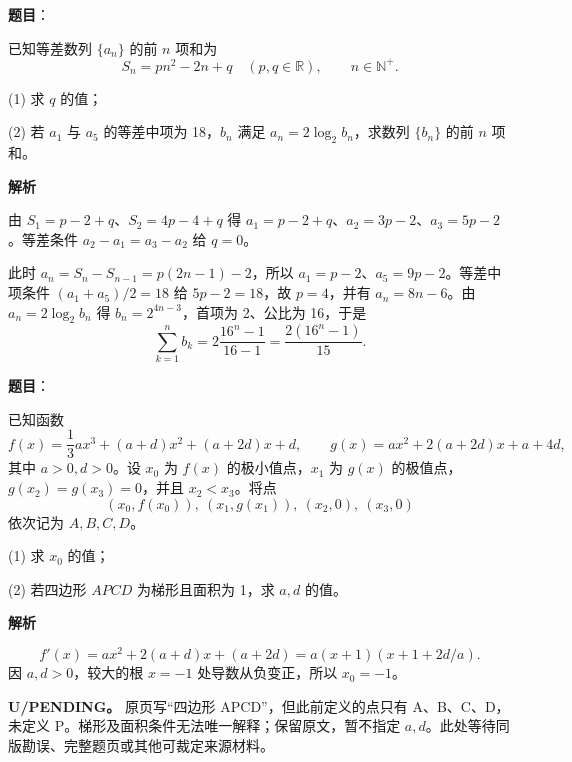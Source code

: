 \begin{answer}

\textbf{题目}：

已知等差数列 \(\{a_n\}\) 的前 \(n\) 项和为
\nopagebreak[4]
\[
S_n=pn^2-2n+q\quad(p,q\in\mathbb R),\qquad n\in\mathbb N^+.
\]

(1) 求 \(q\) 的值；

(2) 若 \(a_1\) 与 \(a_5\) 的等差中项为 18，\(b_n\) 满足 \(a_n=2\log_2b_n\)，求数列 \(\{b_n\}\) 的前 \(n\) 项和。

\textbf{解析}


由 $S_1=p-2+q$、$S_2=4p-4+q$ 得 $a_1=p-2+q$、$a_2=3p-2$、$a_3=5p-2$。等差条件 $a_2-a_1=a_3-a_2$ 给 $q=0$。


此时 $a_n=S_n-S_{n-1}=p(2n-1)-2$，所以 $a_1=p-2$、$a_5=9p-2$。等差中项条件 $(a_1+a_5)/2=18$ 给 $5p-2=18$，故 $p=4$，并有 $a_n=8n-6$。由 $a_n=2\log_2 b_n$ 得 $b_n=2^{4n-3}$，首项为 2、公比为 16，于是
\nopagebreak[4]
\[
\sum_{k=1}^{n}b_k=2\frac{16^n-1}{16-1}=\frac{2(16^n-1)}{15}.
\]



\end{answer}
\begin{answer}

\textbf{题目}：

已知函数
\nopagebreak[4]
\[
f(x)=\frac13ax^3+(a+d)x^2+(a+2d)x+d,\qquad
g(x)=ax^2+2(a+2d)x+a+4d,
\]
其中 \(a>0,d>0\)。设 \(x_0\) 为 \(f(x)\) 的极小值点，\(x_1\) 为 \(g(x)\) 的极值点，\(g(x_2)=g(x_3)=0\)，并且 \(x_2<x_3\)。将点
\nopagebreak[4]
\[
(x_0,f(x_0)),\ (x_1,g(x_1)),\ (x_2,0),\ (x_3,0)
\]
依次记为 \(A,B,C,D\)。

(1) 求 \(x_0\) 的值；

(2) 若四边形 \(APCD\) 为梯形且面积为 1，求 \(a,d\) 的值。

\textbf{解析}


\nopagebreak[4]
\[
f'(x)=ax^2+2(a+d)x+(a+2d)
=a(x+1)(x+1+2d/a).
\]
因 $a,d>0$，较大的根 $x=-1$ 处导数从负变正，所以 $x_0=-1$。


\textbf{U/PENDING。} 原页写“四边形 APCD”，但此前定义的点只有 A、B、C、D，未定义 P。梯形及面积条件无法唯一解释；保留原文，暂不指定 $a,d$。此处等待同版勘误、完整题页或其他可裁定来源材料。



\end{answer}
